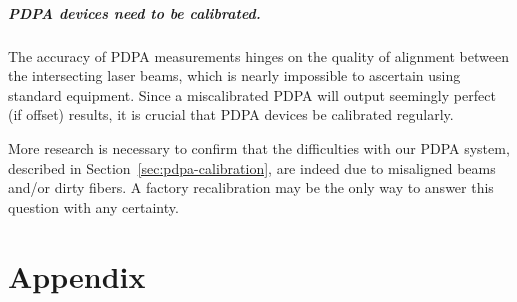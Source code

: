 \documentclass[11.5pt,oneside]{book}
\newcommand*{\secref}[1]{Section~\ref{#1}}
\begin{document}
\paragraph{PDPA devices need to be calibrated.} The accuracy of PDPA
measurements hinges on the quality of alignment between the intersecting
laser beams, which is nearly impossible to ascertain using standard
equipment. Since a miscalibrated PDPA will output seemingly perfect
(if offset) results, it is crucial that PDPA devices be calibrated
regularly.

More research is necessary to confirm that the difficulties with our PDPA system,
described in \secref{sec:pdpa-calibration}, are indeed due to misaligned beams
and/or dirty fibers. A factory recalibration may be the only way to answer this
question with any certainty.



\pagebreak
\appendix
\chapter{Appendix}
\end{document}
